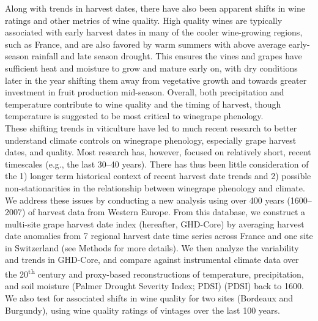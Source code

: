\documentclass[final]{nature}
\begin{document}
\indent Along with trends in harvest dates, there have also been apparent shifts in wine ratings\cite{jones2005} and other metrics of wine quality\cite{Jones:2000br,mori2007}. High quality wines are typically associated with early harvest dates in many of the cooler wine-growing regions, such as France\cite{Jones:2000br,jones2005}, and are also favored by warm summers with above average early-season rainfall and late season drought. This ensures the vines and grapes have sufficient heat and moisture to grow and mature early on, with dry conditions later in the year shifting them away from vegetative growth and towards greater investment in fruit production mid-season\cite{chaves2010,jones2013,baciocco2014}. Overall, both precipitation\cite{vanlee2009} and temperature\cite{baciocco2014} contribute to wine quality and the timing of harvest\cite{odo2012,webb2012}, though temperature is suggested to be most critical to winegrape phenology\cite{coombe1987,jones2005}.\\
\indent These shifting trends in viticulture have led to much recent research to better understand climate controls on winegrape phenology\cite{odo2012,webb2012}, especially grape harvest dates, and quality\cite{coombe1987,jones2005,vanlee2009}.  Most research has, however, focused on relatively short, recent timescales (e.g., the last 30--40 years\cite{Duchene:2005bd,tomasi2011,webb2012}). There has thus been little consideration of the 1) longer term historical context of recent harvest date trends and 2) possible non-stationarities in the relationship between winegrape phenology and climate. We address these issues by conducting a new analysis using over 400 years (1600--2007) of harvest data from Western Europe\cite{Daux2012}. From this database, we construct a multi-site grape harvest date index (hereafter, GHD-Core) by averaging harvest date anomalies from 7 regional harvest date time series across France and one site in Switzerland (see Methods for more details). We then analyze the variability and trends in GHD-Core, and compare against instrumental climate data over the 20\textsuperscript{th} century\cite{Harris2014} and proxy-based reconstructions of temperature\cite{Luterbacher2004}, precipitation\cite{Pauling2006}, and soil moisture (Palmer Drought Severity Index; PDSI)\cite{CookOWDA2015} (PDSI) back to 1600. We also test for associated shifts in wine quality for two sites (Bordeaux and Burgundy), using wine quality ratings of vintages over the last 100 years\cite{Broadbent2002}.\\
\end{document}
